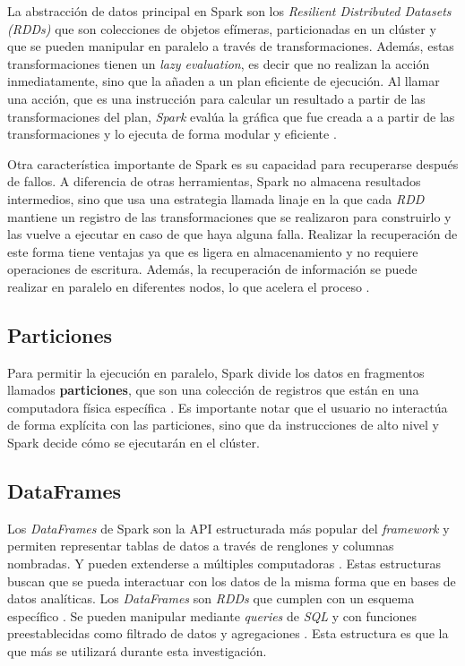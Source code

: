 La abstracción de datos principal en Spark son los \textit{Resilient Distributed Datasets (RDDs)} que son colecciones de objetos efímeras, particionadas en un clúster y que se pueden manipular en paralelo a través de transformaciones. Además, estas transformaciones tienen un \textit{lazy evaluation}, es decir que no realizan la acción inmediatamente, sino que la añaden a un plan eficiente de ejecución. Al llamar una acción, que es una instrucción para calcular un resultado a partir de las transformaciones del plan, \textit{Spark} evalúa la gráfica que fue creada a a partir de las transformaciones y lo ejecuta de forma modular y eficiente \cite{sparkberkeley}.

Otra característica importante de Spark es su capacidad para recuperarse después de fallos. A diferencia de otras herramientas, Spark no almacena resultados intermedios, sino que usa una estrategia llamada linaje en la que cada \textit{RDD} mantiene un registro de las transformaciones que se realizaron para construirlo y las vuelve a ejecutar en caso de que haya alguna falla. Realizar la recuperación de este forma tiene ventajas ya que es ligera en almacenamiento y no requiere operaciones de escritura. Además, la recuperación de información se puede realizar en paralelo en diferentes nodos, lo que acelera el proceso \cite{sparkberkeley}.

\subsection{Particiones}

Para permitir la ejecución en paralelo, Spark divide los datos en fragmentos llamados \textbf{particiones}, que son una colección de registros que están en una computadora física específica \cite{sparkguide}. Es importante notar que el usuario no interactúa de forma explícita con las particiones, sino que da instrucciones de alto nivel y Spark decide cómo se ejecutarán en el clúster.

\subsection{DataFrames}

Los \textit{DataFrames} de Spark son la API estructurada más popular del \textit{framework} y permiten representar tablas de datos a través de renglones y columnas nombradas. Y pueden extenderse a múltiples computadoras \cite{sparkguide}. Estas estructuras buscan que se pueda interactuar con los datos de la misma forma que en bases de datos analíticas. Los \textit{DataFrames} son \textit{RDDs} que cumplen con un esquema específico \cite{sparkberkeley}. Se pueden manipular mediante \textit{queries} de \textit{SQL} y con funciones preestablecidas como filtrado de datos y agregaciones \cite{sparkberkeley}. Esta estructura es que la que más se utilizará durante esta investigación.

